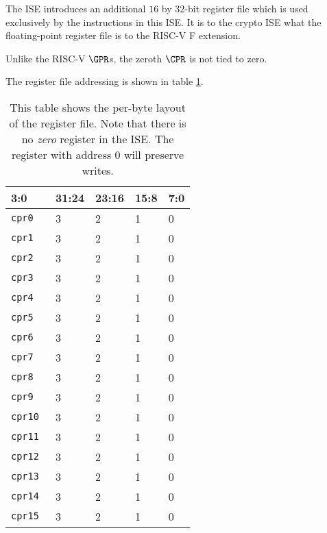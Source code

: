 
The ISE introduces an additional $16$ by $32$-bit register file which
is used exclusively by the instructions in this ISE.
It is to the crypto ISE what the floating-point register file is to the
RISC-V F extension.

Unlike the RISC-V $\GPR$s, the zeroth $\CPR$ is not tied to zero.

The register file addressing is shown in table \ref{tab:state-addr}.

\begin{table}[h!]
\centering
\begin{tabular}{|l|l l l l|}
\hline
\multicolumn{1}{|l|}{3:0} & \textbf{31:24} & \textbf{23:16} & \textbf{15:8} & \textbf{7:0} \\ \hline
{\tt cpr0  } & 3 & 2 & 1 & 0      \\ \hline
{\tt cpr1  } & 3 & 2 & 1 & 0      \\ \hline
{\tt cpr2  } & 3 & 2 & 1 & 0      \\ \hline
{\tt cpr3  } & 3 & 2 & 1 & 0      \\ \hline
{\tt cpr4  } & 3 & 2 & 1 & 0      \\ \hline
{\tt cpr5  } & 3 & 2 & 1 & 0      \\ \hline
{\tt cpr6  } & 3 & 2 & 1 & 0      \\ \hline
{\tt cpr7  } & 3 & 2 & 1 & 0      \\ \hline
{\tt cpr8  } & 3 & 2 & 1 & 0      \\ \hline
{\tt cpr9  } & 3 & 2 & 1 & 0      \\ \hline
{\tt cpr10 } & 3 & 2 & 1 & 0      \\ \hline
{\tt cpr11 } & 3 & 2 & 1 & 0      \\ \hline
{\tt cpr12 } & 3 & 2 & 1 & 0      \\ \hline
{\tt cpr13 } & 3 & 2 & 1 & 0      \\ \hline
{\tt cpr14 } & 3 & 2 & 1 & 0      \\ \hline
{\tt cpr15 } & 3 & 2 & 1 & 0      \\ \hline
\end{tabular}
\caption{This table shows the per-byte layout of the register file.
Note that there is no {\em zero} register in the ISE.
The register with address $0$ will preserve writes.}
\label{tab:state-addr}
\end{table}



